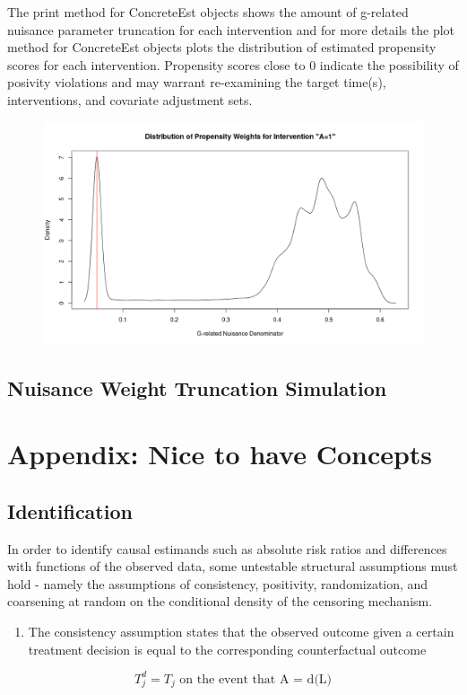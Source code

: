 \documentclass{report}
\newcommand{\1}{\ensuremath{\mathbf{1}}}
\begin{document}
The print method for ConcreteEst objects shows the amount of g-related nuisance parameter truncation for each intervention and for more details the plot method for ConcreteEst objects plots the distribution of estimated propensity scores for each intervention. Propensity scores close to 0 indicate the possibility of posivity violations and may warrant re-examining the target time(s), interventions, and covariate adjustment sets.

\begin{figure}[H]
\center
\includegraphics[width=\linewidth]{fig/A1-propscores.png}
\end{figure}

\subsection{Nuisance Weight Truncation Simulation}
\label{sec:org48001b2}


\section{Appendix: Nice to have Concepts}
\label{sec:org0ff7c78}

\subsection{Identification}
\label{identification}
In order to identify causal estimands such as absolute risk ratios and differences with functions of the observed data, some untestable structural assumptions must hold - namely the assumptions of consistency, positivity, randomization, and coarsening at random on the conditional density of the censoring mechanism. 


\begin{enumerate}
\item The consistency assumption states that the observed outcome given a certain treatment decision is equal to the corresponding counterfactual outcome
\end{enumerate}
\[ T^d_j = T_j \text{ on the event that A = d(L)} \]
\end{document}
